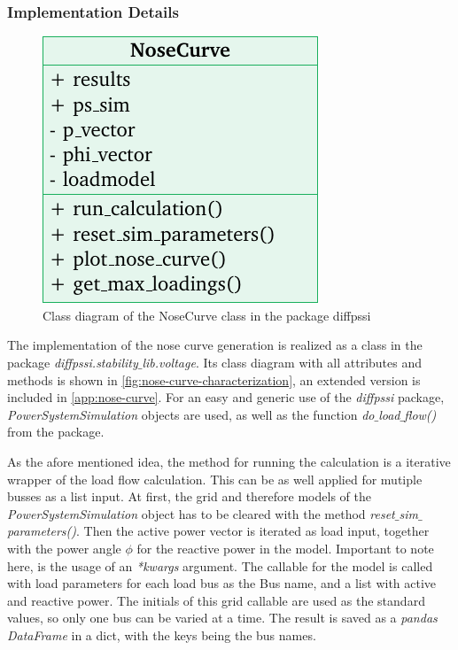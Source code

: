\subsubsection{Implementation Details}

\begin{figure}
        \centering
        \includegraphics[width=.9\linewidth]{tikz_graphics/images/class_diagram_nosecurve_red.pdf}
        \caption{Class diagram of the NoseCurve class in the package diffpssi}
        \label{fig:nose-curve-characterization}
\end{figure}
The implementation of the nose curve generation is realized as a class in the package {\itshape diffpssi.stability$\_$lib.voltage}.
Its class diagram with all attributes and methods is shown in \autoref{fig:nose-curve-characterization}, an extended version is included in \autoref{app:nose-curve}.
For an easy and generic use of the {\itshape diffpssi} package, {\itshape PowerSystemSimulation} objects are used, as well as the function {\itshape do$\_$load$\_$flow()} from the package.

As the afore mentioned idea, the method for running the calculation is a iterative wrapper of the load flow calculation. 
This can be as well applied for mutiple busses as a list input.
At first, the grid and therefore models of the {\itshape PowerSystemSimulation} object has to be cleared with the method {\itshape reset$\_$sim$\_$parameters()}.
Then the active power vector is iterated as load input, together with the power angle $\phi$ for the reactive power in the model.
Important to note here, is the usage of an {\itshape **kwargs} argument.
The callable for the model is called with load parameters for each load bus as the Bus name, and a list with active and reactive power.
The initials of this grid callable are used as the standard values, so only one bus can be varied at a time.
The result is saved as a {\itshape pandas DataFrame} in a dict, with the keys being the bus names.

